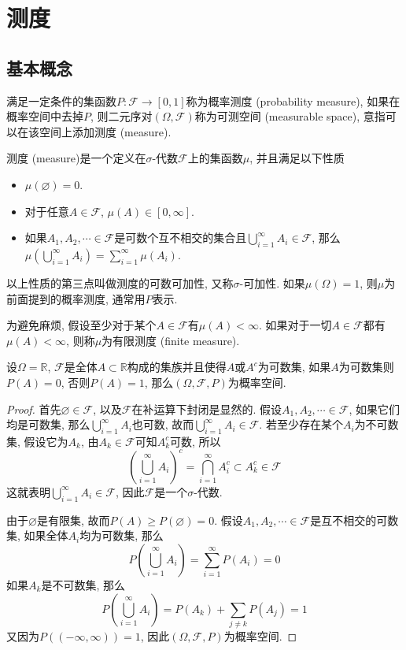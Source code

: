 \documentclass[cn, 12pt, math=mtpro2, bibstyle=apa, blue, twocol]{elegantbook}
\newcommand{\F}{\mathcal{F}}
\newcommand{\R}{\mathbb{R}}
\newcommand{\PP}{P}
\let\emptyset\varnothing
\begin{document}
\section{测度}
\subsection{基本概念}
满足一定条件的集函数$\PP:\F\to[0,1]$称为概率测度 (probability measure), 如果在概率空间中去掉$\PP$, 则二元序对$(\Omega,\F)$称为可测空间 (measurable space), 意指可以在该空间上添加测度 (measure).

\begin{definition}
测度 (measure)是一个定义在$\sigma$-代数$\F$上的集函数$\mu$, 并且满足以下性质
\begin{itemize}
  \item $\mu(\emptyset)=0$.
  \item 对于任意$A\in\F$, $\mu(A)\in [0,\infty]$.
  \item 如果$A_1,A_2,\cdots\in\F$是可数个互不相交的集合且$\bigcup_{i=1}^\infty A_i\in\F$, 那么$\mu(\bigcup_{i=1}^\infty A_i)=\sum_{i=1}^\infty \mu(A_i)$.
\end{itemize}
\end{definition}
以上性质的第三点叫做测度的可数可加性, 又称$\sigma$-可加性. 如果$\mu(\Omega)=1$, 则$\mu$为前面提到的概率测度, 通常用$\PP$表示.

\begin{remark}
为避免麻烦, 假设至少对于某个$A\in\F$有$\mu(A)<\infty$. 如果对于一切$A\in\F$都有$\mu(A)<\infty$, 则称$\mu$为有限测度 (finite measure).
\end{remark}
\begin{example}
设$\Omega=\R$, $\F$是全体$A\subset\R$构成的集族并且使得$A$或$A^c$为可数集, 如果$A$为可数集则$P(A)=0$, 否则$P(A)=1$, 那么$(\Omega,\F,P)$为概率空间.
\end{example}
\begin{proof}
  首先$\emptyset\in\F$, 以及$\F$在补运算下封闭是显然的. 假设$A_1,A_2,\cdots\in\F$, 如果它们均是可数集, 那么$\bigcup_{i=1}^\infty A_i $也可数, 故而$\bigcup_{i=1}^\infty A_i\in\F$. 若至少存在某个$A_i$为不可数集, 假设它为$A_k$, 由$A_k\in\F$可知$A_k^c$可数, 所以
  $$\left(\bigcup_{i=1}^\infty A_i\right)^c=\bigcap_{i=1}^\infty A_i^c\subset A_k^c\in\F$$
  这就表明$\bigcup_{i=1}^\infty A_i\in\F$, 因此$\F$是一个$\sigma$-代数.

  由于$\emptyset$是有限集, 故而$P(A)\geq P(\emptyset)=0$. 假设$A_1,A_2,\cdots\in\F$是互不相交的可数集, 如果全体$A_i$均为可数集, 那么
  $$P\left(\bigcup_{i=1}^\infty A_i\right)=\sum_{i=1}^{\infty}P(A_i)=0$$
  如果$A_k$是不可数集, 那么
  $$P\left(\bigcup_{i=1}^\infty A_i\right)=P(A_k)+\sum_{j\neq k}P(A_j)=1$$
  又因为$P((-\infty,\infty))=1$, 因此$(\Omega,\F,P)$为概率空间.
\end{proof}
\end{document}
